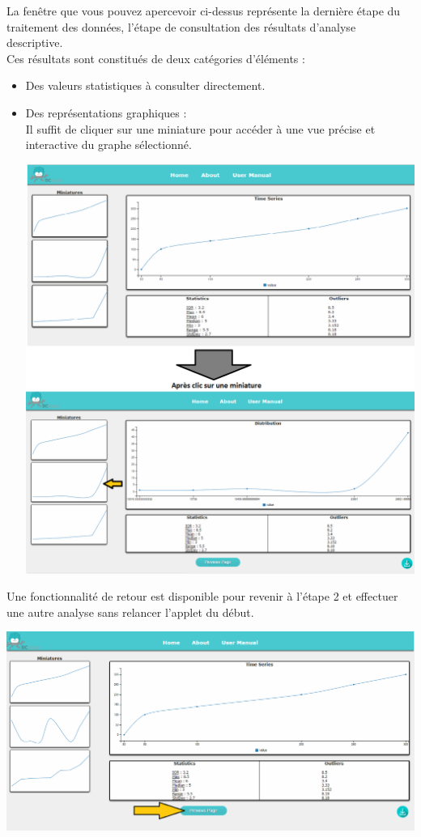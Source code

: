 		La fenêtre que vous pouvez apercevoir ci-dessus représente la dernière étape du traitement des données, l'étape de consultation des résultats d'analyse descriptive.\\
		Ces résultats sont constitués de deux catégories d'éléments :
		\begin{itemize}
			\item Des valeurs statistiques à consulter directement.
			\item Des représentations graphiques :\\
				Il suffit de cliquer sur une miniature pour accéder à une vue précise et interactive du graphe sélectionné.\\
			\begin{center}\includegraphics[scale=0.40]{fenetre3-2.png}\end{center}		
		\end{itemize}
		Une fonctionnalité de retour est disponible pour revenir à l'étape 2 et effectuer une autre analyse sans relancer l'applet du début.\\
			\begin{center}\includegraphics[scale=0.40]{fenetre3prec.png}\end{center}
